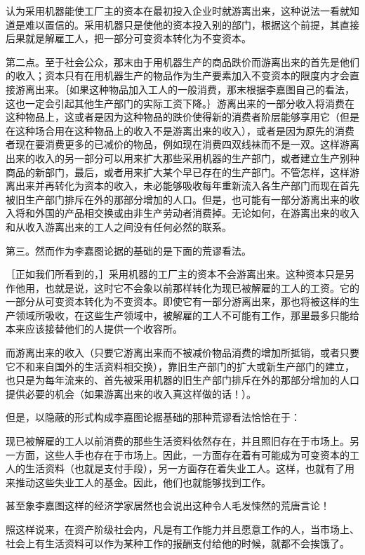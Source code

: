 认为采用机器能使工厂主的资本在最初投入企业时就游离出来，这种说法一看就知道是难以置信的。采用机器只是使他的资本投入别的部门，根据这个前提，其直接后果就是解雇工人，把一部分可变资本转化为不变资本。

第二点。至于社会公众，那末由于用机器生产的商品跌价而游离出来的首先是他们的收入；资本只有在用机器生产的物品作为生产要素加入不变资本的限度内才会直接游离出来。｛如果这种物品加入工人的一般消费，那末根据李嘉图自己的看法，这也一定会引起其他生产部门的实际工资下降。｝游离出来的一部分收入将消费在这种物品上，这或者是因为这种物品的跌价使得新的消费者阶层能够享用它（但是在这种场合用在这种物品上的收入不是游离出来的收入），或者是因为原先的消费者现在要消费更多的已减价的物品，例如现在消费四双线袜而不是一双。这样游离出来的收入的另一部分可以用来扩大那些采用机器的生产部门，或者建立生产别种商品的新部门，最后，或者用来扩大某个早已存在的生产部门。不管怎样，这样游离出来并再转化为资本的收入，未必能够吸收每年重新流入各生产部门而现在首先被旧生产部门排斥在外的那部分增加的人口。但是，也可能有一部分游离出来的收入将和外国的产品相交换或由非生产劳动者消费掉。无论如何，在游离出来的收入和从收入游离出来的工人之间没有任何必然的联系。

第三。然而作为李嘉图论据的基础的是下面的荒谬看法。

［正如我们所看到的，］采用机器的工厂主的资本不会游离出来。这种资本只是另作他用，也就是说，这时它不会象以前那样转化为现已被解雇的工人的工资。它的一部分从可变资本转化为不变资本。即使它有一部分游离出来，那也将被这样的生产领域所吸收，在这些生产领域中，被解雇的工人不可能有工作，那里最多只能给本来应该接替他们的人提供一个收容所。

而游离出来的收入（只要它游离出来而不被减价物品消费的增加所抵销，或者只要它不和来自国外的生活资料相交换），靠旧生产部门的扩大或新生产部门的建立，也只是为每年流来的、首先被采用机器的旧生产部门排斥在外的那部分增加的人口提供必要的机会（如果游离出来的收入真这样做的话！）。

但是，以隐蔽的形式构成李嘉图论据基础的那种荒谬看法恰恰在于：

现已被解雇的工人以前消费的那些生活资料依然存在，并且照旧存在于市场上。另一方面，这些人手也存在于市场上。因此，一方面存在着有可能成为可变资本的工人的生活资料（也就是支付手段），另一方面存在着失业工人。这样，也就有了用来推动这些失业工人的基金。因此，他们也就能够找到工作。

甚至象李嘉图这样的经济学家居然也会说出这种令人毛发悚然的荒唐言论！

照这样说来，在资产阶级社会内，凡是有工作能力并且愿意工作的人，当市场上、社会上有生活资料可以作为某种工作的报酬支付给他的时候，就都不会挨饿了。

